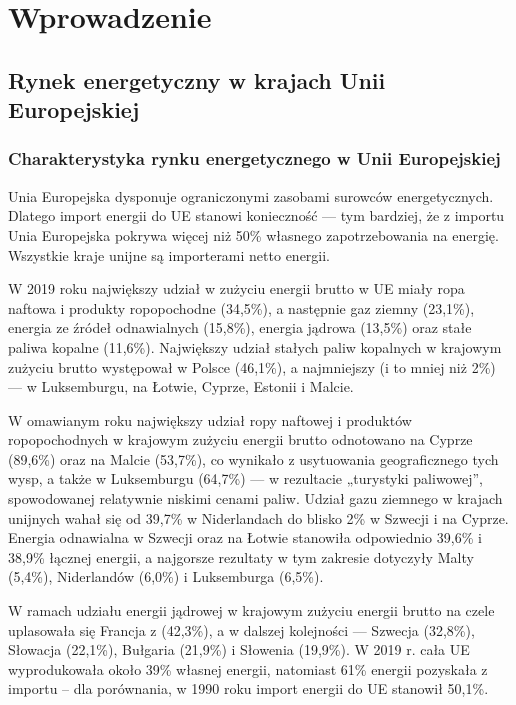 \documentclass[polish, twoside, 12pt, a4paper]{article}
\theoremstyle{definition}
\theoremstyle{plain}
\theoremstyle{remark}
\begin{document}
\clearpage

\section{Wprowadzenie}

\subsection{Rynek energetyczny w krajach Unii Europejskiej}

\subsubsection{Charakterystyka rynku energetycznego w Unii Europejskiej}

Unia Europejska dysponuje ograniczonymi zasobami surowców energetycznych. Dlatego import energii do UE stanowi konieczność --- tym bardziej, że z importu Unia Europejska pokrywa więcej niż 50\% własnego zapotrzebowania na energię. Wszystkie kraje unijne są importerami netto energii. 

W 2019 roku największy udział w zużyciu energii brutto w UE miały ropa naftowa i produkty ropopochodne (34,5\%), a następnie gaz ziemny (23,1\%), energia ze źródeł odnawialnych (15,8\%), energia jądrowa (13,5\%) oraz stałe paliwa kopalne (11,6\%). Największy udział stałych paliw kopalnych w krajowym zużyciu brutto występował w Polsce (46,1\%), a najmniejszy (i to mniej niż 2\%) --- w Luksemburgu, na Łotwie, Cyprze, Estonii i Malcie.

W omawianym roku największy udział ropy naftowej i produktów ropopochodnych w krajowym zużyciu energii brutto odnotowano na Cyprze (89,6\%) oraz na Malcie (53,7\%), co wynikało z usytuowania geograficznego tych wysp, a także w Luksemburgu (64,7\%) --- w rezultacie „turystyki paliwowej”, spowodowanej relatywnie niskimi cenami paliw. Udział gazu ziemnego w krajach unijnych wahał się od 39,7\% w Niderlandach do blisko 2\% w Szwecji i na Cyprze. Energia odnawialna w Szwecji oraz na Łotwie stanowiła odpowiednio 39,6\% i 38,9\% łącznej energii, a najgorsze rezultaty w tym zakresie dotyczyły Malty (5,4\%), Niderlandów (6,0\%) i Luksemburga (6,5\%). 

W ramach udziału energii jądrowej w krajowym zużyciu energii brutto na czele uplasowała się Francja z (42,3\%), a w dalszej kolejności --- Szwecja (32,8\%), Słowacja (22,1\%), Bułgaria (21,9\%) i Słowenia (19,9\%). W 2019 r. cała UE wyprodukowała około 39\% własnej energii, natomiast 61\% energii pozyskała z importu – dla porównania, w 1990 roku import energii do UE stanowił 50,1\%.
\end{document}
